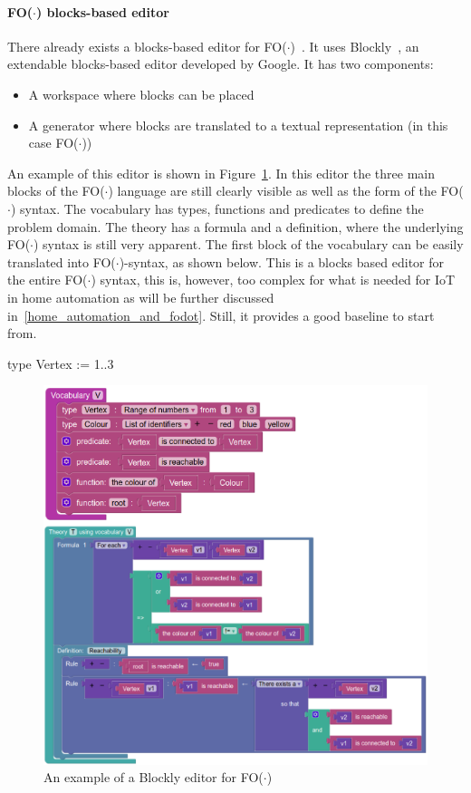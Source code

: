 \documentclass[11pt,a4paper]{report}
\newcommand{\fodot}{FO($\cdot$)\xspace}
\begin{document}
\paragraph{\fodot blocks-based editor}
There already exists a blocks-based editor for \fodot~\cite{IDPStructuredBlockbasedEditor}. It uses Blockly~\cite{Blockly}, an extendable blocks-based editor developed by Google. It has two components:
\begin{itemize}
	\item A workspace where blocks can be placed
	\item A generator where blocks are translated to a textual representation (in this case \fodot)
\end{itemize}
An example of this editor is shown in Figure~\ref{fig:blockly_IDP_example}. In this editor the three main blocks of the \fodot language are still clearly visible as well as the form of the \fodot syntax. The vocabulary has types, functions and predicates to define the problem domain. The theory has a formula and a definition, where the underlying \fodot syntax is still very apparent. The first block of the vocabulary can be easily translated into \fodot-syntax, as shown below. This is a blocks based editor for the entire \fodot syntax, this is, however, too complex for what is needed for IoT in home automation as will be further discussed in~\ref{home_automation_and_fodot}. Still, it provides a good baseline to start from.
\begin{idplisting}
type Vertex := {1..3}
\end{idplisting}

\begin{figure}
    \centering
    \includegraphics[width=0.8\linewidth]{images/blockly_IDP_example.png}
    \caption{An example of a Blockly editor for \fodot}
    \label{fig:blockly_IDP_example}
\end{figure}
\end{document}
